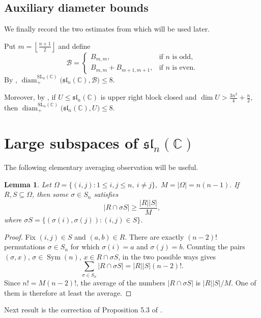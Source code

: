 \documentclass[11pt]{article}
\newtheorem{lemma}[theorem]{Lemma}
\theoremstyle{remark}
\newcommand{\C}{\mathbb C}
\begin{document}
\subsection{Auxiliary diameter bounds}

We finally record the two estimates from \cite{JezernikSpenko} which will
be used later.

Put $m=\left\lfloor\frac{n+1}{2}\right\rfloor$
and define
\[
 \mathcal B=
 \begin{cases}
 B_{m,m},
   &\text{if }n\text{ is odd},\\[2mm]
 B_{m,m}+B_{m+1,m+1},
   &\text{if }n\text{ is even}.
 \end{cases}
\]
By \cite[Lemma~5.1]{JezernikSpenko}, $\operatorname{diam}^{\mathrm{SL}_n(\C)}_{+}
 \bigl(\mathfrak{sl}_n(\C),\mathcal B\bigr)
 \leq8.$

Moreover, by \cite[Proposition~5.2]{JezernikSpenko}, if $U\leq\mathfrak{sl}_n(\C)$ is upper right block closed and $\dim U>\frac{3n^2}{4}+\frac n2,$
then $ \operatorname{diam}^{\mathrm{SL}_n(\C)}_{+}
 \bigl(\mathfrak{sl}_n(\C),U\bigr)
 \leq8.$


\section{Large subspaces of $\mathfrak{sl}_n(\C)$}

The following elementary averaging observation will be useful.

\begin{lemma}\label{lem:averaging}
Let $\Omega=\{(i,j):1\leq i,j\leq n,\ i\neq j\},$ $M=|\Omega|=n(n-1).$
If $R,S\subseteq\Omega$, then some $\sigma\in S_n$ satisfies
\[
 |R\cap \sigma S|\geq \frac{|R||S|}{M},
\]
where
$\sigma S=\{(\sigma(i),\sigma(j)):(i,j)\in S\}$.
\end{lemma}

\begin{proof}
Fix $(i,j)\in S$ and $(a,b)\in R$.  There are exactly $(n-2)!$
permutations $\sigma\in S_n$ for which
$\sigma(i)=a$ and $\sigma(j)=b$.  Counting the pairs $(\sigma,x)$, $\sigma\in \operatorname{Sym}(n)$, $x\in R\cap \sigma S$, in the two possible ways gives
\[
 \sum_{\sigma\in S_n}|R\cap \sigma S|
 =|R||S|(n-2)!.
\]
Since $n!=M(n-2)!$, the average of the numbers
$|R\cap\sigma S|$ is $|R||S|/M$.  One of them is therefore at least the
average.
\end{proof}

Next result is the correction of Proposition 5.3 of \cite{JezernikSpenko}.
\end{document}
